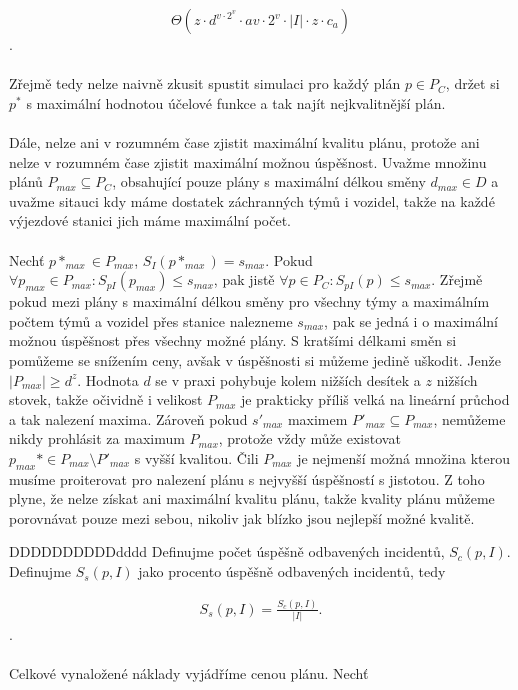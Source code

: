$$
  \Theta{(z \cdot d^{v \cdot 2^v} \cdot av \cdot 2^v \cdot |I| \cdot z \cdot c_a)}
$$
.
\\
\\
Zřejmě tedy nelze naivně zkusit spustit simulaci pro každý plán $p \in P_C$, držet si $p^*$ s maximální hodnotou účelové funkce a tak najít nejkvalitnější plán.
\\
\\
Dále, nelze ani v rozumném čase zjistit maximální kvalitu plánu, protože ani nelze v rozumném čase zjistit maximální možnou úspěšnost.
Uvažme množinu plánů $P_{max} \subseteq P_C$, obsahující pouze plány s maximální délkou směny $d_{max} \in D$ a uvažme sitauci kdy máme dostatek záchranných týmů i vozidel,
takže na každé výjezdové stanici jich máme maximální počet.
\\
\\
Nechť $p*_{max} \in P_{max}$, $S_{I}(p*_{max}) = s_{max}$.
Pokud $\forall p_{max} \in P_{max} \colon S_{pI}(p_{max}) \leq s_{max}$, pak jistě $\forall p \in P_C \colon S_{pI}(p) \leq s_{max}$.
Zřejmě pokud mezi plány s maximální délkou směny pro všechny týmy a maximálním počtem týmů a vozidel přes stanice nalezneme $s_{max}$,
pak se jedná i o maximální možnou úspěšnost přes všechny možné plány. S kratšími délkami směn si pomůžeme se snížením ceny, avšak v úspěšnosti si můžeme jedině uškodit.
Jenže $|P_{max}| \geq d^z$. Hodnota $d$ se v praxi pohybuje kolem nižších desítek a $z$ nižších stovek,
takže očividně i velikost $P_{max}$ je prakticky příliš velká na lineární průchod a tak nalezení maxima.
Zároveň pokud $s'_{max}$ maximem $P'_{max} \subseteq P_{max}$, nemůžeme nikdy prohlásit za maximum $P_{max}$, protože vždy může existovat $p_{max}* \in P_{max} \setminus P'_{max}$ s vyšší kvalitou.
Čili $P_{max}$ je nejmenší možná množina kterou musíme proiterovat pro nalezení plánu s nejvyšší úspěšností s jistotou.
Z toho plyne, že nelze získat ani maximální kvalitu plánu, takže kvality plánu můžeme porovnávat pouze mezi sebou, nikoliv jak blízko jsou nejlepší možné kvalitě.

DDDDDDDDDDdddd
Definujme počet úspěšně odbavených incidentů, $S_c(p, I)$.
Definujme $S_s(p, I)$ jako procento úspěšně odbavených incidentů, tedy

\begin{align}
  S_s(p, I) = \frac{S_c(p, I)}{|I|}.
\end{align}
.
\\
\\
Celkové vynaložené náklady vyjádříme cenou plánu.
Nechť 

